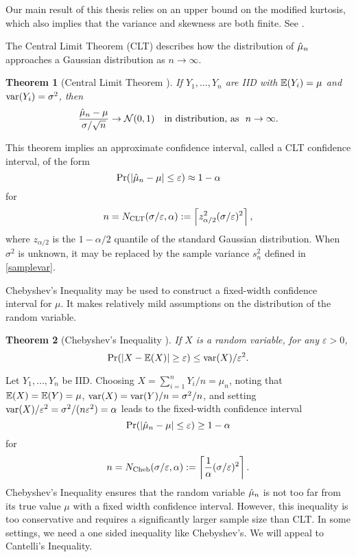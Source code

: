 \documentclass{iitthesis}
\newtheorem{theorem}{Theorem}[section]
\theoremstyle{definition}
\begin{document}
Our main result of this thesis relies on an upper bound on the modified kurtosis, which also implies that the variance and skewness are both finite. See \cite{HJLO12}.


The Central Limit Theorem (CLT) describes how the distribution of $\hat{\mu}_n$ approaches a Gaussian distribution as $n \to \infty$.
\begin{theorem}[Central Limit Theorem {\cite[Theorem 21.1]{JP04}}] \label{clt} 
If $Y_1, \ldots, Y_n$ are IID with $\mathbb{E}(Y_i)=\mu$ and $\operatorname{var}(Y_i) = \sigma^2$, then
$$
\frac{\hmu_n-\mu}{\sigma/\sqrt{n}} \to \dnorm(0,1) \quad \text{in distribution, as} \ \ n\to\infty.
$$
\end{theorem}
This theorem implies an approximate confidence interval, called a CLT confidence interval, of the form
\[
\Pr(\left \lvert \hat{\mu}_{n}-\mu \right \rvert \le \varepsilon) \approx 1- \alpha \qquad \]
for 
\begin{equation}\label{NCLT}
n= N_{\operatorname{CLT}}(\sigma/\varepsilon,\alpha) := \left \lceil z_{\alpha/2}^2 (\sigma/\varepsilon)^2 \right \rceil,
\end{equation}
where $z_{\alpha/2}$ is the $1-\alpha/2$ quantile of the standard Gaussian distribution.  When $\sigma^2$ is unknown, it may be replaced by the sample variance $s_n^2$ defined in \eqref{samplevar}.


Chebyshev's Inequality may be used to construct a fixed-width confidence interval for $\mu$.  It makes relatively mild assumptions on the distribution of the random variable.

\begin{theorem}[Chebyshev's Inequality {\cite[6.1.c]{LB10}}] \label{ChebyThm}
If $X$ is a random variable, for any $\varepsilon>0$, 
$$\Pr(\left \lvert X-\mathbb{E}(X) \right \rvert \ge \varepsilon) \le  \operatorname{var}(X)/\varepsilon^2.$$
\end{theorem}
Let $Y_1, \ldots, Y_n$ be IID. Choosing $X=\sum_{i=1}^n Y_i/n = \mu_n$, noting that $\mathbb{E}(X) = \mathbb{E}(Y) = \mu$, $\operatorname{var}(X) = \operatorname{var}(Y)/n = \sigma^2/n$, and setting $\operatorname{var}(X)/\varepsilon^2=\sigma^2/(n\varepsilon^2) = \alpha$ leads to the fixed-width confidence interval 
\[
\Pr(\left \lvert \hat{\mu}_{n}-\mu \right \rvert \le \varepsilon) \ge 1- \alpha 
\]
 for 
 \begin{align}\label{NCheb}
n=N_{\operatorname{Cheb}}(\sigma/\varepsilon,\alpha):= \left \lceil \frac{1}{\alpha} (\sigma/\varepsilon)^2\right \rceil.
 \end{align}
 Chebyshev's Inequality ensures that the random variable $\hat{\mu}_n$ is not too far from its true value $\mu$ with a fixed width confidence interval. However, this inequality is too conservative and requires a significantly larger sample size than CLT. In some settings, we need a one sided inequality like Chebyshev's. We will appeal to Cantelli's Inequality.
 
\end{document}
